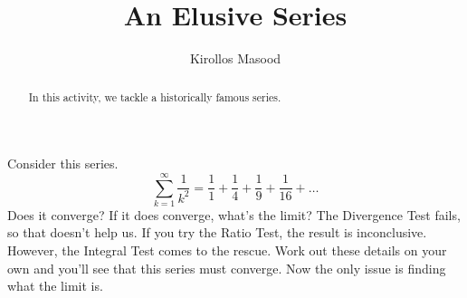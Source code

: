 \documentclass{ximera}
\title{An Elusive Series}
\author{Kirollos Masood}
\begin{document}
\begin{abstract}
In this activity, we tackle a historically famous series.
\end{abstract}
\maketitle

Consider this series.
\[
	\sum_{k=1}^{\infty} \frac{1}{k^2} = \frac{1}{1}+\frac{1}{4}+\frac{1}{9}+\frac{1}{16}+\ldots
\]
Does it converge? If it does converge, what's the limit? The Divergence Test fails, so that doesn't help us. If you try the Ratio Test, the result is inconclusive. However, the Integral Test comes to the rescue. Work out these details on your own and you'll see that this series must converge. Now the only issue is finding what the limit is.
\end{document}
